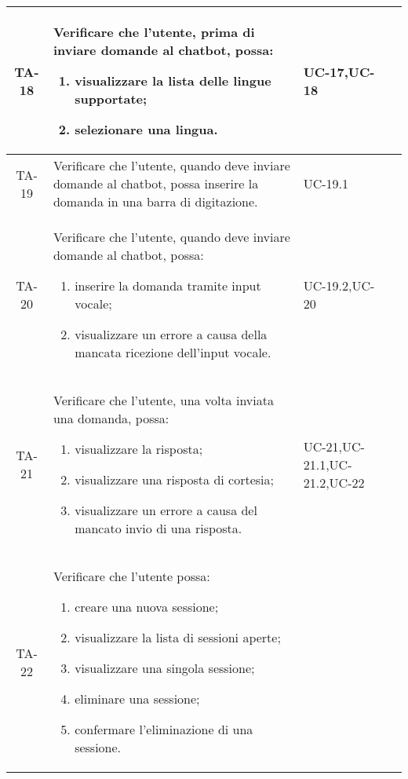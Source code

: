 \begin{xltabular}{\textwidth}{| c | X | X | c |}
    TA-18 & Verificare che l’utente, prima di inviare domande al chatbot, possa:
    \begin{enumerate}
        \item visualizzare la lista delle lingue supportate;
        \item selezionare una lingua.
    \end{enumerate}& UC-17,\newline UC-18 & \textcolor{xmarkcolor}{} \\
    \hline
    TA-19 & Verificare che l’utente, quando deve inviare domande al chatbot, possa inserire la domanda in una barra di digitazione.& UC-19.1 & \textcolor{cmarkcolor}{} \\
    \hline
    TA-20 & Verificare che l’utente, quando deve inviare domande al chatbot, possa:
    \begin{enumerate}
        \item inserire la domanda tramite input vocale;
        \item visualizzare un errore a causa della mancata ricezione dell'input vocale.
    \end{enumerate}& UC-19.2,\newline UC-20 & \textcolor{xmarkcolor}{} \\
    \hline
    TA-21 & Verificare che l’utente, una volta inviata una domanda, possa:
    \begin{enumerate}
        \item visualizzare la risposta;
        \item visualizzare una risposta di cortesia;
        \item visualizzare un errore a causa del mancato invio di una risposta.
    \end{enumerate}& UC-21,\newline UC-21.1,\newline UC-21.2,\newline UC-22 & \textcolor{cmarkcolor}{} \\
    \hline
     TA-22 & Verificare che l’utente possa:
    \begin{enumerate}
        \item creare una nuova sessione;
        \item visualizzare la lista di sessioni aperte;
        \item visualizzare una singola sessione;
        \item eliminare una sessione;
        \item confermare l'eliminazione di una sessione.

\end{enumerate}
\end{xltabular}
